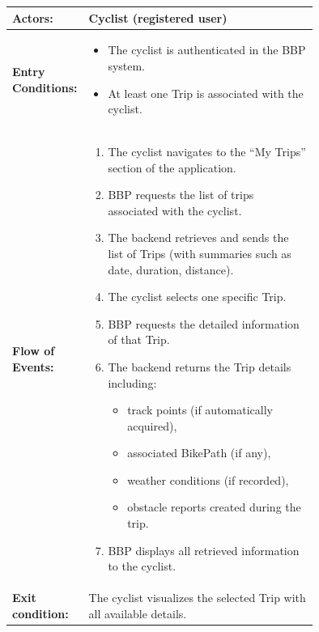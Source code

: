 \begin{center}
\begin{longtable}{|l|p{0.75\linewidth}|}
    \hline
    \textbf{Actors:}           
    & Cyclist (registered user)                                                               \\
    \hline

    \textbf{Entry Conditions:} 
    & \begin{itemize}
          \item The cyclist is authenticated in the BBP system.
          \item At least one Trip is associated with the cyclist.
       \end{itemize}                                                                           \\
    \hline

    \textbf{Flow of Events:}   
    & \begin{enumerate}
          \item The cyclist navigates to the “My Trips” section of the application.
          \item BBP requests the list of trips associated with the cyclist.
          \item The backend retrieves and sends the list of Trips (with summaries such as date, duration, distance).
          \item The cyclist selects one specific Trip.
          \item BBP requests the detailed information of that Trip.
          \item The backend returns the Trip details including:
                \begin{itemize}
                    \item track points (if automatically acquired),
                    \item associated BikePath (if any),
                    \item weather conditions (if recorded),
                    \item obstacle reports created during the trip.
                \end{itemize}
          \item BBP displays all retrieved information to the cyclist.
       \end{enumerate}                                                                           \\
    \hline

    \textbf{Exit condition:}   
    & The cyclist visualizes the selected Trip with all available details.                      \\
    \hline


\end{longtable}
\end{center}
